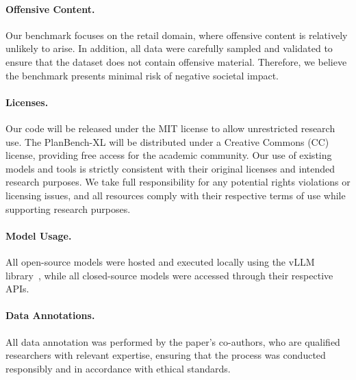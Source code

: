 \documentclass[11pt]{article}
\newcommand{\bench}[1]{PlanBench-XL}
\begin{document}


\paragraph{Offensive Content.}
Our benchmark focuses on the retail domain, where offensive content is relatively unlikely to arise. 
In addition, all data were carefully sampled and validated to ensure that the dataset does not contain offensive material. 
Therefore, we believe the benchmark presents minimal risk of negative societal impact.

\paragraph{Licenses.} 
Our code will be released under the MIT license to allow unrestricted research use. 
The \bench{} will be distributed under a Creative Commons (CC) license, providing free access for the academic community. 
Our use of existing models and tools is strictly consistent with their original licenses and intended research purposes. 
We take full responsibility for any potential rights violations or licensing issues, and all resources comply with their respective terms of use while supporting research purposes.

\paragraph{Model Usage.}
All open-source models were hosted and executed locally using the vLLM library~\cite{vllm}, while all closed-source models were accessed through their respective APIs. 

\paragraph{Data Annotations.}

All data annotation was performed by the paper's co-authors, who are qualified researchers with relevant expertise, ensuring that the process was conducted responsibly and in accordance with ethical standards.

% 
% 



\end{document}
